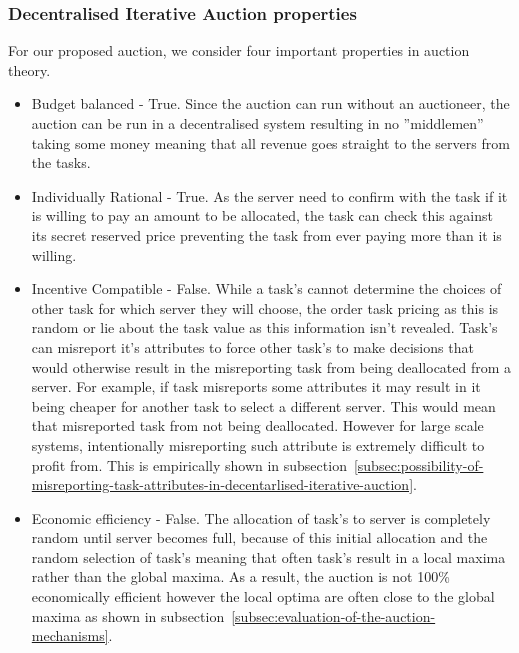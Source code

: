\subsubsection{Decentralised Iterative Auction properties}
\label{subsubsec:decentralised-iterative-auction-properties}
For our proposed auction, we consider four important properties in auction theory.
\begin{itemize}
    \item Budget balanced - True. Since the auction can run without an auctioneer, the auction can be run in a
        decentralised system resulting in no ''middlemen'' taking some money meaning that all revenue goes straight to
        the servers from the tasks.
    \item Individually Rational - True. As the server need to confirm with the task if it is willing to pay an amount
        to be allocated, the task can check this against its secret reserved price preventing the task from ever paying
        more than it is willing.
    \item Incentive Compatible - False. While a task's cannot determine the choices of other task for which server they
        will choose, the order task pricing as this is random or lie about the task value as this information isn't
        revealed. Task's can misreport it's attributes to force other task's to make decisions that would otherwise
        result in the misreporting task from being deallocated from a server. For example, if task misreports some
        attributes it may result in it being cheaper for another task to select a different server. This would mean
        that misreported task from not being deallocated. However for large scale systems, intentionally misreporting
        such attribute is extremely difficult to profit from. This is empirically shown in
        subsection~\ref{subsec:possibility-of-misreporting-task-attributes-in-decentarlised-iterative-auction}.
    \item Economic efficiency - False. The allocation of task's to server is completely random until server becomes full,
        because of this initial allocation and the random selection of task's meaning that often task's result in a
        local maxima rather than the global maxima. As a result, the auction is not 100\% economically efficient
        however the local optima are often close to the global maxima as shown in
        subsection~\ref{subsec:evaluation-of-the-auction-mechanisms}.
\end{itemize}

